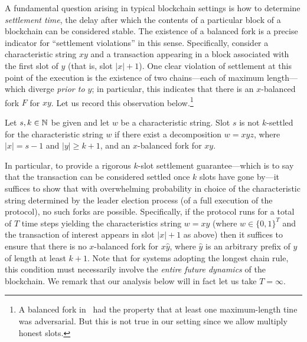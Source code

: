 A fundamental question arising in typical blockchain settings is how
to determine \emph{settlement time}, the delay after which the
contents of a particular block of a blockchain can be considered
stable. The existence of a balanced fork is a precise indicator for
``settlement violations'' in this sense. Specifically, consider a
characteristic string $xy$ and a transaction appearing in a block
associated with the first slot of $y$ (that is, slot $|x| + 1$). One
clear violation of settlement at this point of the execution is the
existence of two chains---each of maximum length---which diverge
\emph{prior to $y$}; in particular, this indicates that there is an
$x$-balanced fork $F$ for $xy$. Let us record this observation below.\footnote{
  A balanced fork in~\cite{LinearConsistency} 
  had the property that 
  at least one maximum-length tine was adversarial. 
  But this is not true in our setting since we allow multiply honest slots.
}


\begin{observation}\label{obs:settlement-balanced-fork}
  Let $s, k \in \mathbb{N}$ be given and 
  let $w$ be a characteristic string. 
  Slot $s$ is not $k$-settled for the characteristic string $w$ 
  if 
  there exist a decomposition $w = xyz$, 
  where $|x| = s - 1$ and $|y| \geq k+1$, 
  and an $x$-balanced fork for $xy$. 
\end{observation}

In particular, to provide a rigorous $k$-slot settlement
guarantee---which is to say that the transaction can be considered
settled once $k$ slots have gone by---it suffices to show that with
overwhelming probability in choice of the characteristic string
determined by the leader election process (of a full execution of the
protocol), no such forks are possible. Specifically, if the protocol
runs for a total of $T$ time steps yielding the characteristics string
$w = xy$ (where $w \in \{0,1\}^T$ and the transaction of interest
appears in slot $|x| + 1$ as above) then it suffices to ensure that
there is no $x$-balanced fork for $x\hat{y}$, where $\hat{y}$ is an
arbitrary prefix of $y$ of length at least $k + 1$. 
Note that
for systems adopting the longest chain rule, this condition must
necessarily involve the \emph{entire future dynamics} of the
blockchain. We remark that our analysis below will in fact let us take
$T = \infty$.


